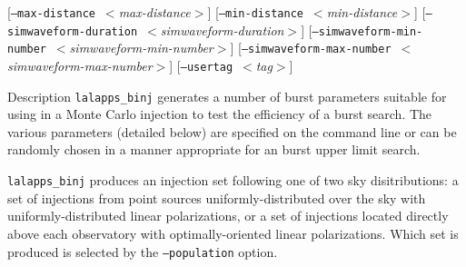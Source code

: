 \documentclass{article}
\newcommand{\prog}[1]{\texttt{#1}}
\newcommand{\option}[1]{\texttt{#1}}
\newcommand{\parm}[1]{$<$\textit{#1}$>$}
\newenvironment{entry}%
  {\begin{list}{}{\renewcommand{\makelabel}[1]%
    {\parbox[b]{\labelwidth}{\makebox[0pt][l]{\textbf{##1}}\\}}%
    \setlength{\labelwidth}{1em}%
    \setlength{\labelsep}{1em}%
    \setlength{\leftmargin}{2em}%
    \setlength{\topsep}{\medskipamount}%
    \setlength{\itemsep}{\medskipamount}%
    \setlength{\parsep}{\medskipamount}%
    \setlength{\listparindent}{0pt}}}
  {\end{list}}
\begin{document}
\begin{entry}
[\option{--max-distance}~\parm{max-distance}] \newline \hspace*{0.5in}
[\option{--min-distance}~\parm{min-distance}] \newline \hspace*{0.5in}
[\option{--simwaveform-duration}~\parm{simwaveform-duration}] \newline \hspace*{0.5in}
[\option{--simwaveform-min-number}~\parm{simwaveform-min-number}] \newline \hspace*{0.5in}
[\option{--simwaveform-max-number}~\parm{simwaveform-max-number}] \newline \hspace*{0.5in}
[\option{--usertag}~\parm{tag}]

\item[Description] 
\prog{lalapps\_binj} generates a number of burst parameters suitable for
using in a Monte Carlo injection to test the efficiency of a burst search.
The various parameters (detailed below) are specified on the command line
or can be randomly chosen in a manner appropriate for an burst upper limit
search.

\prog{lalapps\_binj} produces an injection set following one of two sky
disitributions:  a set of injections from point sources
uniformly-distributed over the sky with uniformly-distributed linear
polarizations, or a set of injections located directly above each
observatory with optimally-oriented linear polarizations.  Which set is
produced is selected by the \option{--population} option.


\end{entry}
\end{document}
